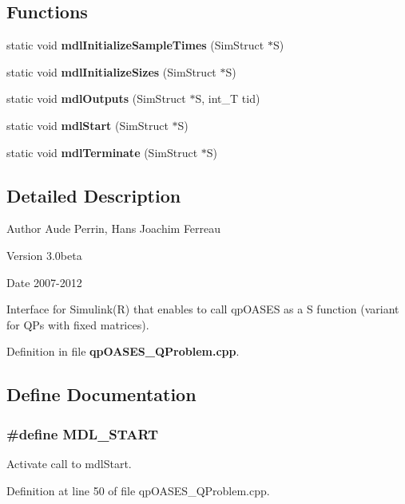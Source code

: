 \subsection*{Functions}
\begin{DoxyCompactItemize}
\item 
static void {\bf mdlInitializeSampleTimes} (SimStruct $\ast$S)
\item 
static void {\bf mdlInitializeSizes} (SimStruct $\ast$S)
\item 
static void {\bf mdlOutputs} (SimStruct $\ast$S, int\_\-T tid)
\item 
static void {\bf mdlStart} (SimStruct $\ast$S)
\item 
static void {\bf mdlTerminate} (SimStruct $\ast$S)
\end{DoxyCompactItemize}


\subsection{Detailed Description}
\begin{DoxyAuthor}{Author}
Aude Perrin, Hans Joachim Ferreau 
\end{DoxyAuthor}
\begin{DoxyVersion}{Version}
3.0beta 
\end{DoxyVersion}
\begin{DoxyDate}{Date}
2007-\/2012
\end{DoxyDate}
Interface for Simulink(R) that enables to call qpOASES as a S function (variant for QPs with fixed matrices). 

Definition in file {\bf qpOASES\_\-QProblem.cpp}.



\subsection{Define Documentation}
\subsubsection[{MDL\_\-START}]{\setlength{\rightskip}{0pt plus 5cm}\#define MDL\_\-START}\label{qpOASES__QProblem_8cpp_ac032abbf580c891fb0c11e63e9bc668a}
Activate call to mdlStart. 

Definition at line 50 of file qpOASES\_\-QProblem.cpp.


